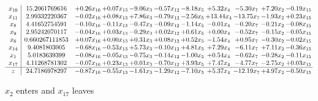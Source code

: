 \documentclass[9pt]{article}
\begin{document}
 \[\begin{array}{c| c c@{\hskip 2pt} c@{\hskip 2pt} c@{\hskip 2pt} c@{\hskip 2pt} c@{\hskip 2pt} c@{\hskip 2pt} c@{\hskip 2pt} c@{\hskip 2pt} c@{\hskip 2pt} }
 x_{10}   &  15.2061769616 & +  0.26 x_{16} & +  0.07 x_{13} & -9.06 x_{3} & -0.57 x_{12} & -8.18 x_{5} & +  5.32 x_{4} & -5.30 x_{7} & +  7.20 x_{2} & -0.19 x_{15}\\
 x_{11}   &  2.99332220367 & -0.02 x_{16} & +  0.08 x_{13} & +  7.86 x_{3} & -0.79 x_{12} & -2.56 x_{5} & + 13.44 x_{4} & -13.75 x_{7} & -1.93 x_{2} & +  0.23 x_{15}\\
 x_{8}   &  4.41652754591 & -0.10 x_{16} & -0.11 x_{13} & -0.47 x_{3} & -0.09 x_{12} & -1.14 x_{5} & -0.01 x_{4} & -0.20 x_{7} & -0.21 x_{2} & -0.08 x_{15}\\
 x_{9}   &  2.95242070117 & -0.04 x_{16} & +  0.03 x_{13} & -0.29 x_{3} & +  0.02 x_{12} & +  0.61 x_{5} & +  0.00 x_{4} & -0.52 x_{7} & -0.15 x_{2} & -0.05 x_{15}\\
 x_{6}   &  0.660267111853 & +  0.07 x_{16} & +  0.00 x_{13} & +  0.31 x_{3} & +  0.08 x_{12} & +  0.52 x_{5} & -1.54 x_{4} & +  0.95 x_{7} & -0.30 x_{2} & -0.02 x_{15}\\
 x_{14}   &  9.4081803005 & -0.68 x_{16} & -0.53 x_{13} & +  5.73 x_{3} & -0.10 x_{12} & +  4.81 x_{5} & +  7.29 x_{4} & -6.11 x_{7} & +  7.11 x_{2} & -0.36 x_{15}\\
 x_{1}   &  5.0183639399 & -0.08 x_{16} & -0.05 x_{13} & -0.75 x_{3} & -0.14 x_{12} & -1.00 x_{5} & +  0.54 x_{4} & -0.62 x_{7} & -0.28 x_{2} & -0.11 x_{15}\\
 x_{17}   &  4.11268781302 & -0.07 x_{16} & +  0.23 x_{13} & +  0.01 x_{3} & -0.70 x_{12} & +  3.93 x_{5} & +  7.47 x_{4} & -4.77 x_{7} & -2.75 x_{2} & +  0.03 x_{15}\\
\hline
z    &  24.7186978297 & -0.87 x_{16} & -0.55 x_{13} & -1.61 x_{3} & -1.29 x_{12} & -7.10 x_{5} & +  5.37 x_{4} & -12.19 x_{7} & +  4.97 x_{2} & -0.50 x_{15}\\
\end{array}\]


 $ x_{2} $ enters and $ x_{17} $ leaves 
\end{document}
